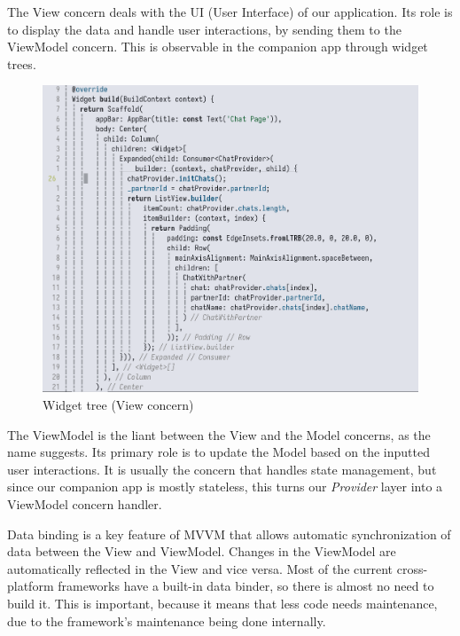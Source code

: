 \par
The View concern deals with the UI (User Interface) of our application. 
Its role is to display the data and handle user interactions, by sending them to the ViewModel concern. 
This is observable in the companion app through widget trees.
\begin{figure}[htbp]
    \centering
    \includegraphics[scale=0.3]{pictures/widget_tree.png}
    \caption{Widget tree (View concern)}
    \label{widgetTreeExample}
\end{figure}
\par
The ViewModel is the liant between the View and the Model concerns, as the name suggests. 
Its primary role is to update the Model based on the inputted user interactions. 
It is usually the concern that handles state management, but since our companion app is mostly stateless, 
this turns our \textit{Provider} layer into a ViewModel concern handler.

\par
Data binding is a key feature of MVVM that allows automatic synchronization of data between the View and ViewModel. 
Changes in the ViewModel are automatically reflected in the View and vice versa. Most of the current cross-platform frameworks have a built-in data binder, 
so there is almost no need to build it. 
This is important, because it means that less code needs maintenance, due to the framework's maintenance being done internally.

